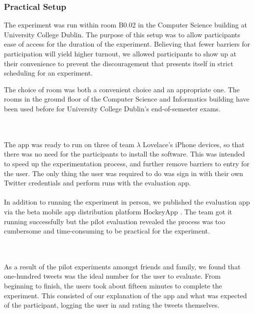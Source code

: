 \documentclass{article}
\begin{document}
\subsubsection*{Practical Setup} 







The experiment was run within room B0.02 in the Computer Science building at University College Dublin. The purpose of this setup was to allow participants ease of access for the duration of the experiment. Believing that fewer barriers for participation will yield higher turnout, we allowed participants to show up at their convenience to prevent the discouragement that presents itself in strict scheduling for an experiment. 




The choice of room was both a convenient choice and an appropriate one. The rooms in the ground floor of the Computer Science and Informatics building have been used before for University College Dublin's end-of-semester exams. 


\\\\
The app was ready to run on three of team $\lambda$ Lovelace's iPhone devices, so that there was no need for the participants to install the software. This was intended to speed up the experimentation process, and further remove barriers to entry for the user. The only thing the user was required to do was sign in with their own Twitter credentials and perform runs with the evaluation app.
\\\\
In addition to running the experiment in person, we published the evaluation app via the beta mobile app distribution platform HockeyApp \cite{hockeyapp}. The team got it running successfully but the pilot evaluation revealed the process was too cumbersome and time-consuming to be practical for the experiment.


\\\\
As a result of the pilot experiments amongst friends and family, we found that one-hundred tweets was the ideal number for the user to evaluate. From beginning to finish, the users took about fifteen minutes to complete the experiment. This consisted of our explanation of the app and what was expected of the participant, logging the user in and rating the tweets themselves. 
\end{document}
